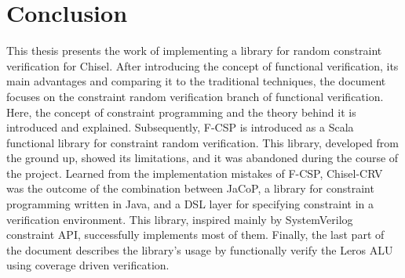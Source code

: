 



\chapter{Conclusion}\label{conclusion}
This thesis presents the work of implementing a library for random constraint
verification for Chisel. After introducing the concept of functional
verification, its main advantages and comparing it to the traditional
techniques, the document focuses on the constraint random verification branch of
functional verification. Here, the concept of constraint programming and the
theory behind it is introduced and explained. Subsequently, F-CSP is introduced
as a Scala functional library for constraint random verification. This library,
developed from the ground up, showed its limitations, and it was abandoned
during the course of the project. Learned from the implementation mistakes of
F-CSP, Chisel-CRV was the outcome of the combination between JaCoP, a library
for constraint programming written in Java, and a DSL layer for specifying
constraint in a verification environment. This library, inspired mainly by
SystemVerilog constraint API, successfully implements most of them. Finally, the
last part of the document describes the library's usage by functionally verify
the Leros ALU using coverage driven verification.


